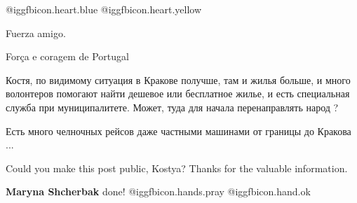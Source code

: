  
 
 
 
 
\zzSecCmt

\begin{itemize} %
 @igg{fbicon.heart.blue}  @igg{fbicon.heart.yellow} 

Fuerza amigo.

Força e coragem de Portugal


Костя, по видимому ситуация в Кракове получше, там и жилья больше, и много
волонтеров помогают найти дешевое или бесплатное жилье, и есть специальная
служба при муниципалитете. Может, туда для начала перенаправлять народ ?

Есть много челночных рейсов даже частными машинами от границы до Кракова ...

 Could you make this post public, Kostya? Thanks for the
valuable information.

 \textbf{Maryna Shcherbak} done!
@igg{fbicon.hands.pray} @igg{fbicon.hand.ok} 
\end{itemize} %
